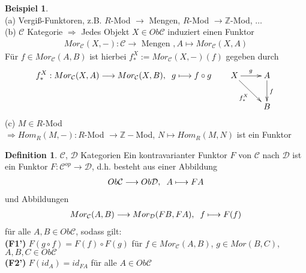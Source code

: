\documentclass[10pt,a4paper,numbers=endperiod]{scrreprt}
\theoremstyle{definition}
\newtheorem{defi}[satz]{Definition}
\newtheorem{bsp}[satz]{Beispiel}
\def\ZZ{{\mathbb Z}}
\begin{document}
\begin{bsp}
	$ $\\
	(a) Vergiß-Funktoren, z.B. $R$-Mod $\rightarrow$ Mengen, $R$-Mod $\rightarrow \ZZ$-Mod, $\ldots$\\
	(b) $\mathcal{C}$ Kategorie $\Rightarrow$ Jedes Objekt $X \in Ob \mathcal{C}$ induziert einen Funktor \begin{align*}
		Mor_{\mathcal{C}} (X, -): \mathcal{C} \longrightarrow \text{ Mengen }, A \longmapsto Mor_{\mathcal{C}} (X, A)
	\end{align*}
	Für $f \in Mor_{\mathcal{C}}(A, B)$ ist hierbei $f_*^X := Mor_{\mathcal{C}} (X, -) (f)$ gegeben durch \begin{align*}
		f_*^X : Mor_{\mathcal{C}}(X, A) \longrightarrow Mor_{\mathcal{C}}(X, B), \hspace{2mm} g \longmapsto f \circ g  \hspace{7 mm} \begin{xy}
		\xymatrix{
			X \ar[r]^{g} \ar[dr]_{f_*^X}   &   A \ar[d]^f \\
			 &   B 
		}
		\end{xy}
	\end{align*}
	(c) $M \in R$-Mod\\
	$\Rightarrow Hom_R(M, -): R$-Mod $\rightarrow \ZZ-$Mod, $N \mapsto Hom_R(M,N)$ ist ein Funktor
\end{bsp}

\begin{defi}
	$\mathcal{C}$, $\mathcal{D}$ Kategorien
	Ein kontravarianter Funktor $F$ von $\mathcal{C}$ nach $\mathcal{D}$ ist ein Funktor $F: \mathcal{C}^{op} \rightarrow \mathcal{D}$, d.h. besteht aus einer Abbildung \begin{align*}
		Ob \mathcal{C} \longrightarrow Ob \mathcal{D}, \hspace*{2mm} A \longmapsto FA
	\end{align*}
	und Abbildungen \begin{align*}
	Mor_{\mathcal{C}} (A, B) \longrightarrow Mor_{\mathcal{D}} (FB, FA), \hspace*{2mm} f \longmapsto F(f)
	\end{align*}
	für alle $A, B \in Ob \mathcal{C}$, sodass gilt:\\
	\textbf{(F1')} $F(g \circ f) = F(f) \circ F(g)$ für $f \in Mor_{\mathcal{C}}(A,B)$, $g \in Mor(B, C)$, $A, B, C \in Ob \mathcal{C}$\\
	\textbf{(F2')} $F(id_A) = id_{FA}$ für alle $A \in Ob \mathcal{C}$
\end{defi}
\end{document}
